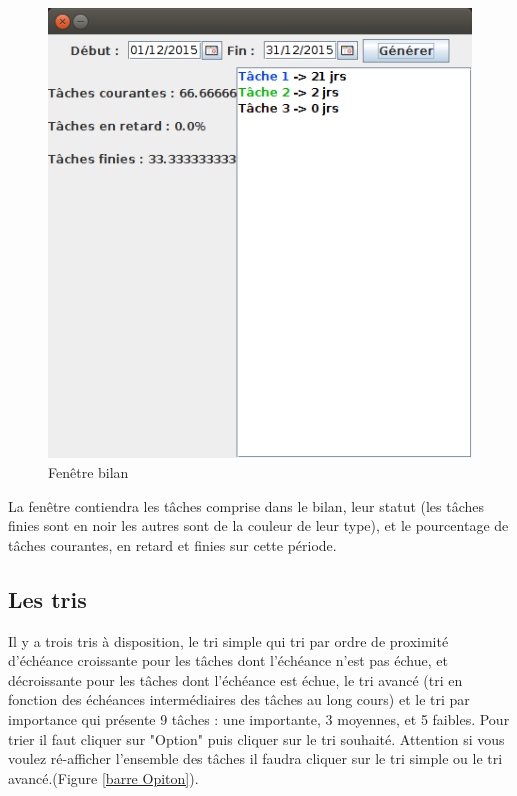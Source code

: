 \documentclass{article}
\begin{document}
\begin{figure}
	\centering
	\includegraphics[scale=0.5]{images/CaptureDisplayBilan.png}
	\caption{Fenêtre bilan}
	\label{bilan}
\end{figure}

La fenêtre contiendra les tâches comprise dans le bilan, leur statut (les tâches finies sont en noir les autres sont de la couleur de leur type), et le pourcentage de tâches courantes, en retard et finies sur cette période.

\subsection{Les tris}

Il y a trois tris à disposition, le tri simple qui tri par ordre de proximité
d'échéance croissante pour les tâches dont l'échéance n'est pas échue, et décroissante
pour les tâches dont l'échéance est échue, le tri avancé (tri en fonction des échéances intermédiaires des tâches au long cours) et le tri par importance qui présente 9 tâches : une importante, 3 moyennes, et 5 faibles. Pour trier il faut cliquer sur "Option" puis cliquer sur le tri souhaité. Attention si vous voulez ré-afficher l'ensemble des tâches il faudra cliquer sur le tri simple ou le tri avancé.(Figure \ref{barre Opiton}).
\end{document}
